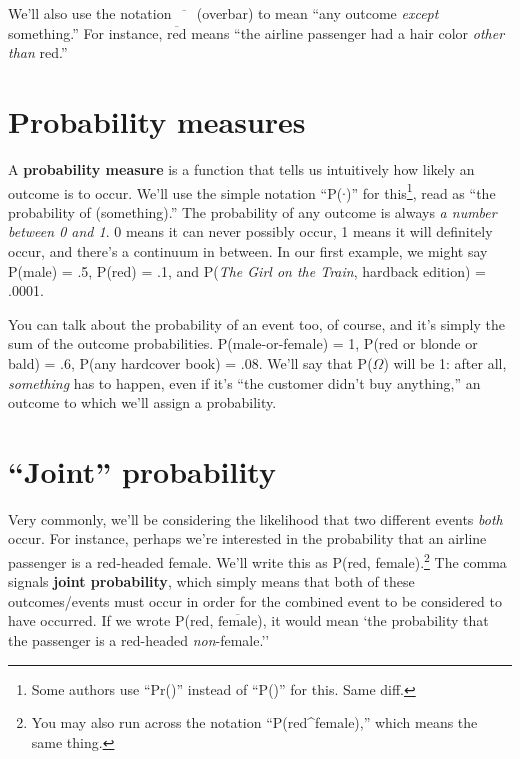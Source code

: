 We'll also use the notation $\overline{\phantom{xx}}$ (overbar) to mean ``any
outcome \textit{except} something.'' For instance, $\overline{\textrm{red}}$
means ``the airline passenger had a hair color \textit{other than} red.''

\section{Probability measures}


A \textbf{probability measure} is a function that tells us intuitively how
likely an outcome is to occur. We'll use the simple notation ``P($\cdot$)'' for
this\footnote{Some authors use ``Pr()'' instead of ``P()'' for this. Same
diff.}, read as ``the probability of (something).'' The probability of any
outcome is always \textit{a number between 0 and 1}. 0 means it can never
possibly occur, 1 means it will definitely occur, and there's a continuum in
between. In our first example, we might say P(male) = .5, P(red) = .1, and
P(\textit{The Girl on the Train}, hardback edition) = .0001.

You can talk about the probability of an event too, of course, and it's simply
the sum of the outcome probabilities. P(male-or-female) = 1, P(red or blonde
or bald) = .6, P(any hardcover book) = .08. We'll say that P($\Omega$) will be
1: after all, \textit{something} has to happen, even if it's ``the customer
didn't buy anything,'' an outcome to which we'll assign a probability.

\section{``Joint'' probability}

Very commonly, we'll be considering the likelihood that two different events
\textit{both} occur. For instance, perhaps we're interested in the probability
that an airline passenger is a red-headed female. We'll write this as P(red,
female).\footnote{You may also run across the notation
``P(red\textbf{\^{}}female),'' which means the same thing.} The comma signals
\textbf{joint probability}, which simply means that both of these
outcomes/events must occur in order for the combined event to be considered to
have occurred. If we wrote P(red, $\overline{\textrm{female}}$), it would mean
`the probability that the passenger is a red-headed \textit{non}-female.''

